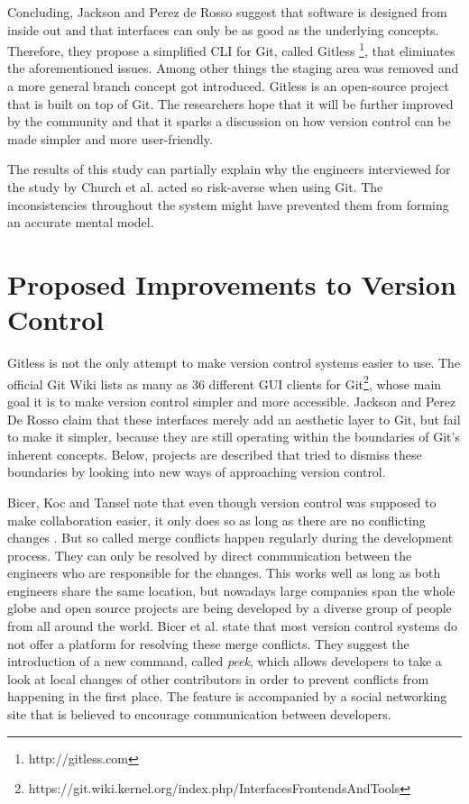 Concluding, Jackson and Perez de Rosso suggest that software is designed from inside out and that interfaces can only be as good as the underlying concepts. Therefore, they propose a simplified \ac{CLI} for Git, called Gitless \footnote{http://gitless.com}, that eliminates the aforementioned issues. Among other things the staging area was removed and a more general branch concept got introduced. Gitless is an open-source project that is built on top of Git. The researchers hope that it will be further improved by the community and that it sparks a discussion on how version control can be made simpler and more user-friendly.

The results of this study can partially explain why the engineers interviewed for the study by Church et al. \cite{church_case_2014}
acted so risk-averse when using Git. The inconsistencies throughout the system might have prevented them from forming an accurate mental model.

\section{Proposed Improvements to Version Control}
Gitless is not the only attempt to make version control systems easier to use. The official Git Wiki lists as many as 36 different GUI clients for Git\footnote{https://git.wiki.kernel.org/index.php/InterfacesFrontendsAndTools}, whose main goal it is to make version control simpler and more accessible. Jackson and Perez De Rosso claim that these interfaces merely add an aesthetic layer to Git, but fail to make it simpler, because they are still operating within the boundaries of Git's inherent concepts. Below, projects are described that tried to dismiss these boundaries by looking into new ways of approaching version control.

Bicer, Koc and Tansel note that even though version control was supposed to make collaboration  easier, it only does so as long as there are no conflicting changes \cite{koc_towards_2012}. But so called merge conflicts happen regularly during the development process. They can only be resolved by direct communication between the engineers who are responsible for the changes. This works well as long as both engineers share the same location, but nowadays large companies span the whole globe and open source projects are being developed by a diverse group of people from all around the world. Bicer et al. state that most version control systems do not offer a platform for resolving these merge conflicts. They suggest the introduction of a new command, called \textit{peek}, which allows developers to take a look at local changes of other contributors in order to prevent conflicts from happening in the first place. The feature is accompanied by a social networking site that is believed to encourage communication between developers.

